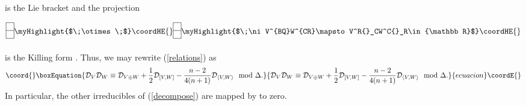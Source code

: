 \documentclass[a4paper,12pt]{amsart}
\providecommand{\topten}{\circledcirc}
\begin{document}
is the Lie bracket \coordHE{} and the projection
$$\begin{picture}(10,30)
\put(0,5){\line(1,0){10}}
\put(0,15){\line(1,0){10}}
\put(0,25){\line(1,0){10}}
\put(0,5){\line(0,1){20}}
\put(10,5){\line(0,1){20}}
\end{picture}
\raisebox{11pt}{\myHighlight{$\;\otimes\;$}\coordHE{}}
\begin{picture}(10,30)
\put(0,5){\line(1,0){10}}
\put(0,15){\line(1,0){10}}
\put(0,25){\line(1,0){10}}
\put(0,5){\line(0,1){20}}
\put(10,5){\line(0,1){20}}
\end{picture}
\raisebox{11pt}{\myHighlight{$\;\ni V^{BQ}W^{CR}\mapsto V^R{}_CW^C{}_R\in{\mathbb R}$}\coordHE{}}$$
is the Killing form \coordHE{}. Thus, we may rewrite
(\ref{relations}) as
\begin{equation}\coord{}\boxEquation{\label{identity}
{\mathcal D}_V{\mathcal D}_W\equiv{\mathcal D}_{V\topten W}
+\frac{1}{2}{\mathcal D}_{[V,W]}
-\frac{n-2}{4(n+1)}{\mathcal D}_{\langle V,W\rangle}\mod\Delta.}{{\mathcal D}_V{\mathcal D}_W\equiv{\mathcal D}_{V\topten W}
+\frac{1}{2}{\mathcal D}_{[V,W]}
-\frac{n-2}{4(n+1)}{\mathcal D}_{\langle V,W\rangle}\mod\Delta.}{ecuacion}\coordE{}\end{equation}
In particular, the other irreducibles of (\ref{decompose}) are mapped by
\coordHE{} to zero.
\end{document}
